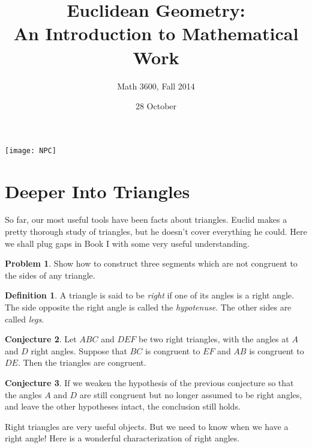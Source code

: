 \documentclass{tufte-handout}
\title{Euclidean Geometry:\\An Introduction to Mathematical Work}
\author[]{Math 3600, Fall 2014}
\date{28 October}
\theoremstyle{definition}
\newtheorem{problem}{Problem}[section]
\newtheorem{conjecture}[problem]{Conjecture}
\newtheorem*{definition}{Definition}
\begin{document}
\maketitle

\begin{marginfigure}
    \texttt{[image: NPC]}
\end{marginfigure}

\setcounter{section}{7}

\section{Deeper Into Triangles}

So far, our most useful tools have been facts about triangles. Euclid makes a pretty thorough study of triangles, but he doesn't cover everything he could. 
Here we shall plug  gaps in Book I with some very useful understanding.

\begin{problem}
\label{prob:triangle-inequality}
Show how to construct three segments which are not congruent to the sides of any triangle.
\end{problem}


\begin{definition}
\label{defn:right-triangles}
A triangle is said to be \emph{right} if one of its angles is a right angle. 
The side opposite the right angle is called the \emph{hypotenuse}. 
The other sides are called \emph{legs}.
\end{definition}

\begin{conjecture}
\label{conj:RASS}
Let $ABC$ and $DEF$ be two right triangles, with the angles at $A$ and $D$ right angles. 
Suppose that $BC$ is congruent to $EF$ and $AB$ is congruent to $DE$. 
Then the triangles are congruent.
\end{conjecture}

\begin{conjecture}
\label{conj:ASS}
If we weaken the hypothesis of the previous conjecture so that the angles $A$ and $D$ are still congruent but no longer assumed to be right angles, and leave the other hypotheses intact, the conclusion still holds.
\end{conjecture}

Right triangles are very useful objects. 
But we need to know when we have a right angle! 
Here is a wonderful characterization of right angles.
\end{document}
